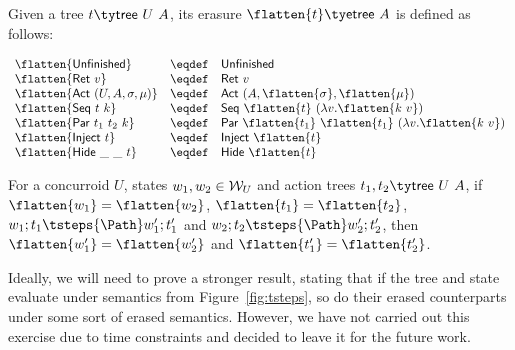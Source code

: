 \begin{definition}
\label{def:tree-erasure}

Given a tree $t \ty \mathsf{tree}~U~A$, its erasure $\flatten{t} \ty
\mathsf{etree}~A$ is defined as follows:

\[
\begin{array}{lcl}
  \flatten{\mathsf{Unfinished}}  & \eqdef &  \mathsf{Unfinished} 
  \\
  \flatten{\mathsf{Ret}~v}  & \eqdef &  \mathsf{Ret}~v 
  \\
  \flatten{\mathsf{Act}~(U, A, \sigma, \mu)}  & \eqdef &  
  \mathsf{Act}~(A, \flatten{\sigma}, \flatten{\mu}) 
  \\
  \flatten{\mathsf{Seq}~t~k} & \eqdef & 
  \mathsf{Seq}~\flatten{t}~(\lambda v. \flatten{k~v})
  \\
  \flatten{\mathsf{Par}~t_1~t_2~k} & \eqdef &
  \mathsf{Par}~\flatten{t_1}~\flatten{t_1}~(\lambda v. \flatten{k~v}) 
  \\
  \flatten{\mathsf{Inject}~t} & \eqdef &
  \mathsf{Inject}~\flatten{t}
  \\
  \flatten{\mathsf{Hide}~\_~\_~t}  & \eqdef &
  \mathsf{Hide}~\flatten{t}
  \\
\end{array}
\] 
  
\end{definition}

\begin{theorem}
\label{thm:erasure-irrel}
For a concurroid $U$, states $w_1, w_2 \in {\cal W}_U$ and action
trees $t_1, t_2 \ty \mathsf{tree}~U~A$, if $\flatten{w_1} =
\flatten{w_2}$, $\flatten{t_1} = \flatten{t_2}$, 
%
$w_1; t_1 \tsteps{\Path} w_1'; t_1'$ and
%
$w_2; t_2 \tsteps{\Path} w_2'; t_2'$, then 
%
$\flatten{w_1'} = \flatten{w_2'}$ and $\flatten{t_1'} = \flatten{t_2'}$.
\end{theorem}

Ideally, we will need to prove a stronger result, stating that if the
tree and state evaluate under semantics from Figure~\ref{fig:tsteps},
so do their erased counterparts under some sort of erased
semantics. However, we have not carried out this exercise due to time
constraints and decided to leave it for the future work.



